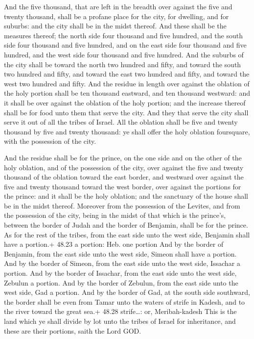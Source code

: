  And the five thousand, that are left in the breadth over
against the five and twenty thousand, shall be a profane place for the
city, for dwelling, and for suburbs: and the city shall be in the midst
thereof.  And these shall be the measures thereof; the
north side four thousand and five hundred, and the south side four
thousand and five hundred, and on the east side four thousand and five
hundred, and the west side four thousand and five hundred. 
And the suburbs of the city shall be toward the north two hundred and
fifty, and toward the south two hundred and fifty, and toward the east
two hundred and fifty, and toward the west two hundred and fifty.
 And the residue in length over against the oblation of the
holy portion shall be ten thousand eastward, and ten thousand westward:
and it shall be over against the oblation of the holy portion; and the
increase thereof shall be for food unto them that serve the city.
 And they that serve the city shall serve it out of all the
tribes of Israel.  All the oblation shall be five and
twenty thousand by five and twenty thousand: ye shall offer the holy
oblation foursquare, with the possession of the city.

 And the residue shall be for the prince, on the one side
and on the other of the holy oblation, and of the possession of the
city, over against the five and twenty thousand of the oblation toward
the east border, and westward over against the five and twenty thousand
toward the west border, over against the portions for the prince: and it
shall be the holy oblation; and the sanctuary of the house shall be in
the midst thereof.  Moreover from the possession of the
Levites, and from the possession of the city, being in the midst of that
which is the prince's, between the border of Judah and the border of
Benjamin, shall be for the prince.  As for the rest of the
tribes, from the east side unto the west side, Benjamin shall have a
portion.+ 48.23 a portion: Heb. one portion  And by the
border of Benjamin, from the east side unto the west side, Simeon shall
have a portion.  And by the border of Simeon, from the east
side unto the west side, Issachar a portion.  And by the
border of Issachar, from the east side unto the west side, Zebulun a
portion.  And by the border of Zebulun, from the east side
unto the west side, Gad a portion.  And by the border of
Gad, at the south side southward, the border shall be even from Tamar
unto the waters of strife in Kadesh, and to the river toward the great
sea.+ 48.28 strife\ldots: or, Meribah-kadesh  This is the
land which ye shall divide by lot unto the tribes of Israel for
inheritance, and these are their portions, saith the Lord GOD.


